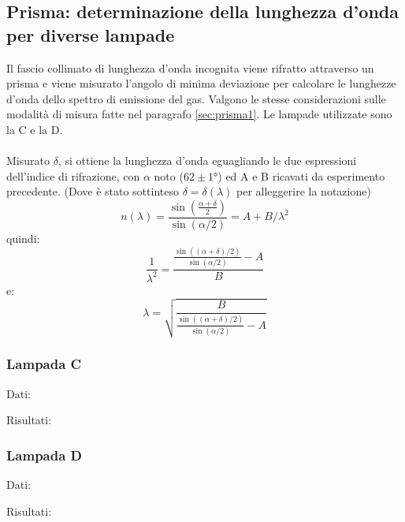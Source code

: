 \clearpage
\subsection{Prisma: determinazione della lunghezza d'onda per diverse lampade}
\label{sec:prisma2}
Il fascio collimato di lunghezza d'onda incognita viene rifratto attraverso un prisma e viene misurato l'angolo di minima deviazione per calcolare le lunghezze d'onda dello spettro di emissione del gas. Valgono le stesse considerazioni sulle modalità di misura fatte nel paragrafo \ref{sec:prisma1}. Le lampade utilizzate sono la C e la D.\\
\\
Misurato $\delta$, si ottiene la lunghezza d'onda eguagliando le due espressioni dell'indice di rifrazione, con $\alpha$ noto ($62 \pm 1 °$) ed A e B ricavati da esperimento precedente. (Dove è stato sottinteso $\delta = \delta(\lambda)$ per alleggerire la notazione)
    $$ n(\lambda) = \frac{\sin(\frac{\alpha + \delta }{2})}{\sin(\alpha/2) } = A + B/\lambda^2 $$
quindi:
    $$ \frac{1}{\lambda^2} = \frac{\frac{ \sin( (\alpha + \delta)/2 ) }{\sin(\alpha/2) } - A}{B} $$
e:
    $$\lambda = \sqrt{ \frac{B}{ \frac{ \sin( (\alpha + \delta)/2 ) }{\sin(\alpha/2) } -A } } $$
\subsubsection{Lampada C}
Dati:

Risultati:



\subsubsection{Lampada D}
Dati:

Risultati:



